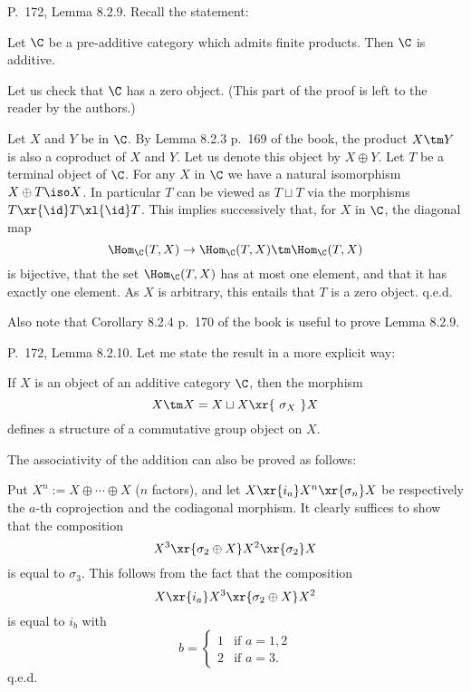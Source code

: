 \documentclass[12pt]{article}
\theoremstyle{remark}
\theoremstyle{definition}
\begin{document}
\begin{s} 
P.~172, Lemma 8.2.9. Recall the statement:

\begin{lem}[Lemma 8.2.9 p. 172] 
Let $\C$ be a pre-additive category which admits finite products. Then $\C$ is additive.
\end{lem}

Let us check that $\C$ has a zero object. (This part of the proof is left to the reader by the authors.) 

Let $X$ and $Y$ be in $\C$. By Lemma 8.2.3 p.~169 of the book, the product $X\tm Y$ is also a coproduct of $X$ and $Y$. Let us denote this object by $X\oplus Y$. Let $T$ be a terminal object of $\C$. For any $X$ in $\C$ we have a natural isomorphism $X\oplus T\iso X$. In particular $T$ can be viewed as $T\sqcup T$ via the morphisms $T\xr{\id}T\xl{\id}T$. This implies successively that, for $X$ in $\C$, the diagonal map 
$$
\Hom_\C(T,X)\to\Hom_\C(T,X)\tm\Hom_\C(T,X)
$$ 
is bijective, that the set $\Hom_\C(T,X)$ has at most one element, and that it has exactly one element. As $X$ is arbitrary, this entails that $T$ is a zero object. q.e.d.

Also note that Corollary 8.2.4 p.~170 of the book is useful to prove Lemma 8.2.9.
\end{s}

%

\begin{s} 
P.~172, Lemma 8.2.10. Let me state the result in a more explicit way: 

\begin{lem}[Lemma 8.2.10 p.~172]
If $X$ is an object of an additive category $\C$, then the morphism %
$$
X\tm X=X\sqcup X\xr{\ \sigma_X\ }X
$$ 
defines a structure of a commutative group object on $X$.
\end{lem} 

The associativity of the addition can also be proved as follows:

Put $X^n:=X\oplus\cdots\oplus X$ ($n$ factors), and let $X\xr{i_a}X^n\xr{\sigma_n}X$ be respectively the $a$-th coprojection and the codiagonal morphism. It clearly suffices to show that the composition 
$$
X^3\xr{\sigma_2\oplus X}X^2\xr{\sigma_2}X
$$ 
is equal to $\sigma_3$. This follows from the fact that the composition 
$$
X\xr{i_a}X^3\xr{\sigma_2\oplus X}X^2
$$ 
is equal to $i_b$ with 
$$
b=\begin{cases}1&\text{if }a=1,2\\2&\text{if }a=3.\end{cases}
$$ 
q.e.d.
\end{s}
\end{document}
